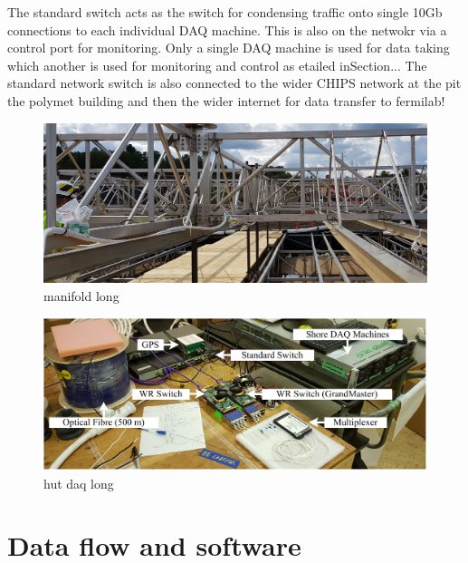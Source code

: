 The standard switch acts as the switch for condensing traffic onto single 10Gb connections to each
individual DAQ machine. This is also on the netwokr via a control port for monitoring. Only a
single DAQ machine is used for data taking which another is used for monitoring and control as
etailed inSection... The standard network switch is also connected to the wider CHIPS network at
the pit the polymet building and then the wider internet for data transfer to fermilab!

\begin{figure} %
    \includegraphics[width=\textwidth]{diagrams/5-daq/manifold.jpg}
    \caption[manifold short]
    {manifold long}
    \label{fig:manifold}
\end{figure}

\begin{figure} %
    \includegraphics[width=\textwidth]{diagrams/5-daq/hut_daq.pdf}
    \caption[hut daq short]
    {hut daq long}
    \label{fig:hut_daq}
\end{figure}

\section{Data flow and software} %
\label{sec:daq_soft} %

